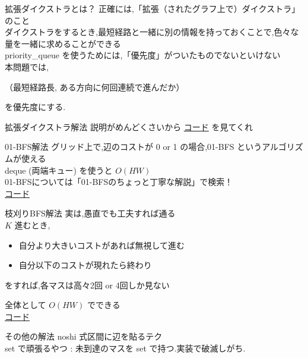 \documentclass[dvipdfmx,12pt]{beamer}%
\begin{document}
\begin{frame}{拡張ダイクストラとは？}
正確には,「拡張（されたグラフ上で）ダイクストラ」のこと\\
ダイクストラをするとき,最短経路と一緒に別の情報を持っておくことで,色々な量を一緒に求めることができる \\
priority\_queue を使うためには,「優先度」がついたものでないといけない \\
本問題では,\\
\begin{center}
（最短経路長, ある方向に何回連続で進んだか）
\end{center}
を優先度にする.
\end{frame}

\begin{frame}{拡張ダイクストラ解法}
説明がめんどくさいから \href{https://atcoder.jp/contests/abc170/submissions/14452259}{コード} を見てくれ
\end{frame}

\begin{frame}{01-BFS解法}
グリッド上で,辺のコストが 0 or 1 の場合,01-BFS というアルゴリズムが使える \\
deque (両端キュー) を使うと $ O(HW) $ \\
01-BFSについては「01-BFSのちょっと丁寧な解説」で検索！\\

\href{https://atcoder.jp/contests/abc170/submissions/14447856}{コード}
\end{frame}

\begin{frame}{枝刈りBFS解法}
実は,愚直でも工夫すれば通る\\
$K$ 進むとき,\\
\begin{itemize}
	\item 自分より大きいコストがあれば無視して進む
	\item 自分以下のコストが現れたら終わり
\end{itemize}
をすれば,各マスは高々2回 or 4回しか見ない

全体として $ O(HW) $ でできる\\
\href{https://atcoder.jp/contests/abc170/submissions/14447887}{コード}
\end{frame}

\begin{frame}{その他の解法}
noshi 式区間に辺を貼るテク\\
set で頑張るやつ : 未到達のマスを set で持つ.実装で破滅しがち.
\end{frame}
%
%
\end{document}
